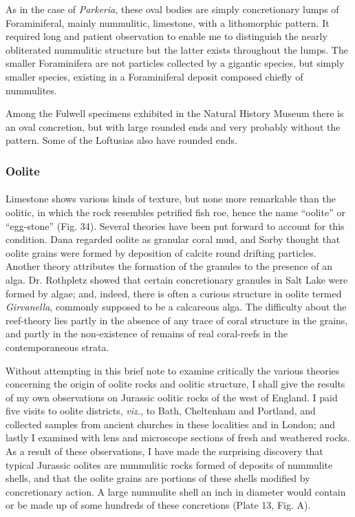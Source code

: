 \documentclass[a4paper, 12pt, oneside]{article}
\begin{document}
As in the case of \emph{Parkeria}, these oval bodies are simply concretionary lumps of Foraminiferal, mainly nummulitic, limestone, with a lithomorphic pattern. It required long and patient observation to enable me to distinguish the nearly obliterated nummulitic structure but the latter exists throughout the lumps. The smaller Foraminifera are not particles collected by a gigantic species, but simply smaller species, existing in a Foraminiferal deposit composed chiefly of nummulites.

Among the Fulwell specimens exhibited in the Natural History Museum there is an oval concretion, but with large rounded ends and very probably without the pattern. Some of the Loftusias also have rounded ends.

\subsubsection{Oolite}
\paragraph{}
Limestone shows various kinds of texture, but none more remarkable than the oolitic, in which the rock resembles petrified fish roe, hence the name ``oolite'' or ``egg-stone'' (Fig. 34). Several theories have been put forward to account for this condition. Dana regarded oolite as granular coral mud, and Sorby thought that oolite grains were formed by deposition of calcite round drifting particles. Another theory attributes the formation of the granules to the presence of an alga. Dr. Rothpletz showed that certain concretionary granules in Salt Lake were formed by algae; and, indeed, there is often a curious structure in oolite termed \emph{Girvanella}, commonly supposed to be a calcareous alga. The difficulty about the reef-theory lies partly in the absence of any trace of coral structure in the grains, and partly in the non-existence of remains of real coral-reefs in the contemporaneous strata.

Without attempting in this brief note to examine critically the various theories concerning the origin of oolite rocks and oolitic structure, I shall give the results of my own observations on Jurassic oolitic rocks of the west of England. I paid five visits to oolite districts, \emph{viz.}, to Bath, Cheltenham and Portland, and collected samples from ancient churches in these localities and in London; and lastly I examined with lens and microscope sections of fresh and weathered rocks. As a result of these observations, I have made the surprising discovery that typical Jurassic oolites are nummulitic rocks formed of deposits of nummulite shells, and that the oolite grains are portions of these shells modified by concretionary action. A large nummulite shell an inch in diameter would contain or be made up of some hundreds of these concretions (Plate 13, Fig. A).
\end{document}
